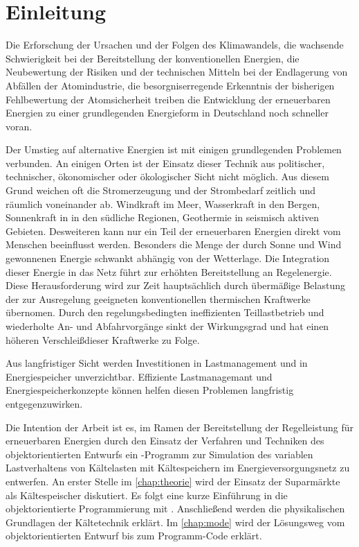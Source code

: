 \chapter{Einleitung}
\label{chap:einleitung}
Die Erforschung der Ursachen und der Folgen des Klimawandels, die wachsende
Schwierigkeit bei der Bereitstellung der konventionellen Energien, die
Neubewertung der Risiken und der technischen Mitteln bei der Endlagerung von
Abfällen der Atomindustrie, die besorgniserregende Erkenntnis der bisherigen
Fehlbewertung der Atomsicherheit treiben die Entwicklung der erneuerbaren
Energien zu einer grundlegenden Energieform in Deutschland noch schneller voran.

Der Umstieg auf alternative Energien ist mit einigen grundlegenden Problemen
verbunden. An einigen Orten ist der Einsatz dieser Technik aus politischer,
technischer, ökonomischer oder ökologischer Sicht nicht möglich. Aus diesem
Grund weichen oft die Stromerzeugung und der Strombedarf zeitlich und räumlich
voneinander ab.  Windkraft im Meer, Wasserkraft in den Bergen, Sonnenkraft in
in den s\"udliche Regionen, Geothermie in seismisch aktiven Gebieten.
Desweiteren kann nur ein Teil der erneuerbaren Energien direkt vom Menschen
beeinflusst werden. Besonders die Menge der durch Sonne und Wind gewonnenen
Energie schwankt abhängig von der Wetterlage. Die Integration dieser Energie in
das Netz führt zur erhöhten Bereitstellung an Regelenergie. Diese
Herausforderung wird zur Zeit haupts\"achlich durch übermäßige Belastung der zur
Ausregelung geeigneten konventionellen thermischen Kraftwerke \"ubernomen. Durch
den regelungsbedingten ineffizienten Teillastbetrieb und wiederholte An- und
Abfahrvorgänge sinkt der Wirkungsgrad und hat einen h\"oheren
Verschlei\ss dieser Kraftwerke zu Folge.

Aus langfristiger Sicht werden Investitionen in Lastmanagement und in
Energiespeicher unverzichtbar. Effiziente Lastmanagemant und
Energiespeicherkonzepte k\"onnen helfen diesen Problemen langfristig
entgegenzuwirken.

Die Intention der Arbeit ist es, im Ramen der Bereitstellung der Regelleistung
f\"ur erneuerbaren Energien durch den Einsatz der Verfahren und Techniken des
objektorientierten Entwurfs ein \matlab-Programm zur Simulation des variablen
Lastverhaltens von Kältelasten mit Kältespeichern im Energieversorgungsnetz zu
entwerfen. An erster Stelle im \cref{chap:theorie} wird der Einsatz der
Suparm\"arkte als K\"altespeischer diskutiert. Es folgt eine kurze Einf\"uhrung
in die objektorientierte Programmierung mit \matlab. Anschlie\ss end werden die
physikalischen Grundlagen der K\"altetechnik erkl\"art. Im \cref{chap:mode} wird
der L\"osungsweg vom objektorientierten Entwurf bis zum Programm-Code erkl\"art.

